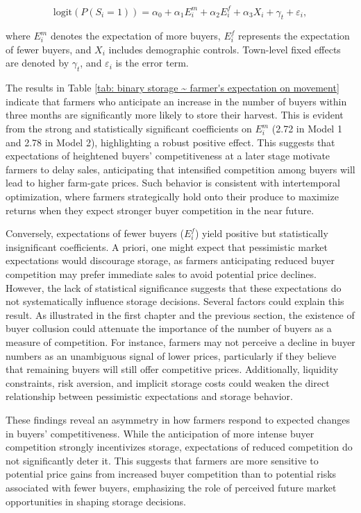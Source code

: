 \documentclass[12pt]{article}
\begin{document}
\begin{equation}
    \text{logit} \left( P(S_i = 1) \right) = \alpha_0 + \alpha_1 E^m_i + \alpha_2 E^f_i + \alpha_3 X_i + \gamma_t + \varepsilon_i,
\end{equation}

where $E^m_i$ denotes the expectation of more buyers, $E^f_i$ represents the expectation of fewer buyers, and $X_i$ includes demographic controls. Town-level fixed effects are denoted by $\gamma_t$, and $\varepsilon_i$ is the error term.



The results in Table \ref{tab: binary storage ~ farmer's expectation on movement} indicate that farmers who anticipate an increase in the number of buyers within three months are significantly more likely to store their harvest. This is evident from the strong and statistically significant coefficients on $E^m_i$ (2.72 in Model 1 and 2.78 in Model 2), highlighting a robust positive effect. This suggests that expectations of heightened buyers' competitiveness at a later stage motivate farmers to delay sales, anticipating that intensified competition among buyers will lead to higher farm-gate prices. Such behavior is consistent with intertemporal optimization, where farmers strategically hold onto their produce to maximize returns when they expect stronger buyer competition in the near future.  

Conversely, expectations of fewer buyers ($E^f_i$) yield positive but statistically insignificant coefficients. A priori, one might expect that pessimistic market expectations would discourage storage, as farmers anticipating reduced buyer competition may prefer immediate sales to avoid potential price declines. However, the lack of statistical significance suggests that these expectations do not systematically influence storage decisions. Several factors could explain this result. As illustrated in the first chapter and the previous section, the existence of buyer collusion could attenuate the importance of the number of buyers as a measure of competition. For instance, farmers may not perceive a decline in buyer numbers as an unambiguous signal of lower prices, particularly if they believe that remaining buyers will still offer competitive prices. Additionally, liquidity constraints, risk aversion, and implicit storage costs could weaken the direct relationship between pessimistic expectations and storage behavior.  

These findings reveal an asymmetry in how farmers respond to expected changes in buyers' competitiveness. While the anticipation of more intense buyer competition strongly incentivizes storage, expectations of reduced competition do not significantly deter it. This suggests that farmers are more sensitive to potential price gains from increased buyer competition than to potential risks associated with fewer buyers, emphasizing the role of perceived future market opportunities in shaping storage decisions.
\end{document}
